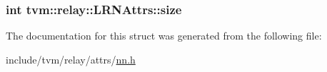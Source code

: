 \subsubsection[{\texorpdfstring{size}{size}}]{\setlength{\rightskip}{0pt plus 5cm}int tvm\+::relay\+::\+L\+R\+N\+Attrs\+::size}\hypertarget{structtvm_1_1relay_1_1LRNAttrs_a3758ed1f8a8bcf73008ae1dd2bfa148e}{}\label{structtvm_1_1relay_1_1LRNAttrs_a3758ed1f8a8bcf73008ae1dd2bfa148e}


The documentation for this struct was generated from the following file\+:\begin{DoxyCompactItemize}
\item 
include/tvm/relay/attrs/\hyperlink{include_2tvm_2relay_2attrs_2nn_8h}{nn.\+h}\end{DoxyCompactItemize}
